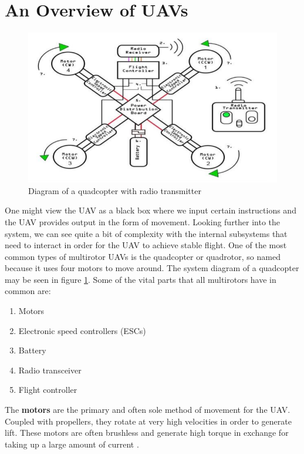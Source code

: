 \documentclass[english]{upeeei}
\begin{document}
\section{An Overview of UAVs}
\begin{figure}[h]
    \centering
    \includegraphics[scale=0.7]{images/fc_diag.PNG}
    \caption{Diagram of a quadcopter with radio transmitter\cite{fcDesign2019}}
    \label{fig:baseQuad}
\end{figure}
One might view the UAV as a black box where we input certain instructions and the UAV provides output in the form of
movement. Looking further into the system, we can see quite a bit of complexity with the internal subsystems that need
to interact in order for the UAV to achieve stable flight.
One of the most common types of multirotor UAVs is the quadcopter or quadrotor, so named because it uses four motors to
move around. The system diagram of a quadcopter may be seen in figure \ref{fig:baseQuad}. Some of the vital parts that all
multirotors have in common are:
\begin{enumerate}
    \item Motors
    \item Electronic speed controllers (ESCs)
    \item Battery
    \item Radio transceiver
    \item Flight controller
\end{enumerate}
The \textbf{motors} are the primary and often sole method of movement for the UAV. Coupled with propellers, they rotate at
very high velocities in order to generate lift. These motors are often brushless and generate high torque in exchange for
taking up a large amount of current \cite{fcDesign2019}. 
\newline
\end{document}
